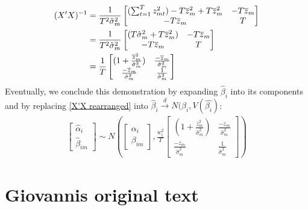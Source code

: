 \documentclass[]{article}
\begin{document}
\begin{align} \label{X'X rearranged}
	(X'X)^{-1} &=  \frac{1}{T^2\hat{\sigma}_{m}^2} 
	\begin{bmatrix} (\sum_{t=1}^{T}z_{mt}^2) -T\overline{z}_m^2 + T\overline{z}_m^2 & -T\overline{z}_m \\ -T\overline{z}_m & T \end{bmatrix} \notag \\
	&= 	\frac{1}{T^2\hat{\sigma}_{m}^2}
	\begin{bmatrix} (T\hat{\sigma}_{m}^2 + T\overline{z}_m^2) & -T\overline{z}_m \\ -T\overline{z}_m & T \end{bmatrix} \notag \\
	&=  \frac{1}{T} 
	\begin{bmatrix} (1 + \frac{\overline{z}_m^2}{\hat{\sigma}_{m}^2}) & \frac{-\overline{z}_m}{\hat{\sigma}_{m}^2} \\ \frac{-\overline{z}_m}{\hat{\sigma}_{m}^2} & \frac{1}{\hat{\sigma}_{m}^2} \end{bmatrix}   
\end{align}
Eventually, we conclude this demonstration by expanding $\hat{\beta}_i$ into its components and by replacing \ref{X'X rearranged} into $\hat{\beta}_i \overset{d}{\to} N(\beta_i,V(\hat{\beta_i})$:
\begin{align}
	\begin{bmatrix} \hat{\alpha}_i \\ \hat{\beta}_{im} \end{bmatrix}
	\sim N(\begin{bmatrix} \alpha_i \\ \beta_{im} \end{bmatrix}, \frac{w_i^2}{T}\begin{bmatrix} (1 + \frac{\overline{z}_m^2}{\hat{\sigma}_{m}^2}) & \frac{-\overline{z}_m}{\hat{\sigma}_{m}^2} \\ \frac{-\overline{z}_m}{\hat{\sigma}_{m}^2} & \frac{1}{\hat{\sigma}_{m}^2} \end{bmatrix}) 
\end{align}

\section{Giovannis original text}
\end{document}
